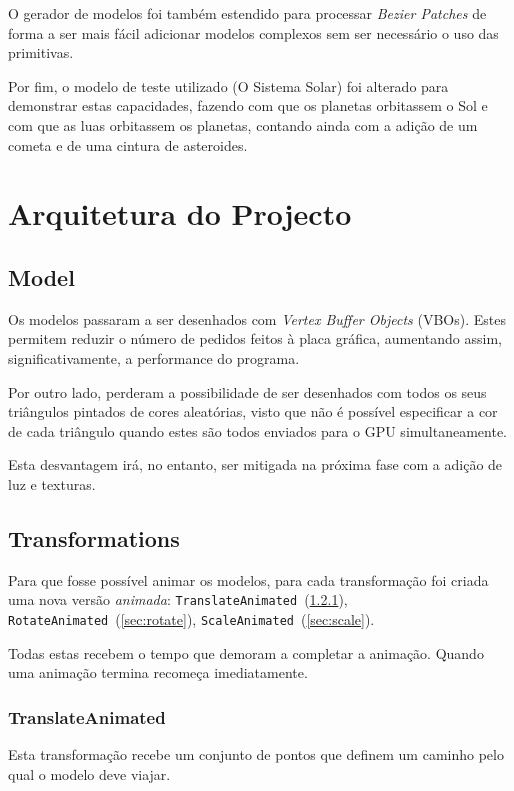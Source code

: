 \documentclass[a4paper]{article}
\begin{document}
O gerador de modelos foi também estendido para processar \textit{Bezier Patches} de forma a ser mais fácil adicionar modelos complexos sem ser necessário o uso das primitivas.

Por fim, o modelo de teste utilizado (O Sistema Solar) foi alterado para demonstrar estas capacidades, fazendo com que os planetas orbitassem o Sol e com que as luas orbitassem os planetas, contando ainda com a adição de um cometa e de uma cintura de asteroides.

\section{Arquitetura do Projecto}

\subsection{Model}\label{sec:models}

Os modelos passaram a ser desenhados com \textit{Vertex Buffer Objects} (VBOs). Estes permitem reduzir o número de pedidos feitos à placa gráfica, aumentando assim, significativamente, a performance do programa.

Por outro lado, perderam a possibilidade de ser desenhados com todos os seus triângulos pintados de cores aleatórias, visto que não é possível especificar a cor de cada triângulo quando estes são todos enviados para o GPU simultaneamente.

Esta desvantagem irá, no entanto, ser mitigada na próxima fase com a adição de luz e texturas.

\subsection{Transformations}

Para que fosse possível animar os modelos, para cada transformação foi criada uma nova versão \textit{animada}: \texttt{TranslateAnimated}~(\ref{sec:translate}), \texttt{RotateAnimated}~(\ref{sec:rotate}), \texttt{ScaleAnimated}~(\ref{sec:scale}).

Todas estas recebem o tempo que demoram a completar a animação. Quando uma animação termina recomeça imediatamente.

\subsubsection{TranslateAnimated}\label{sec:translate}

Esta transformação recebe um conjunto de pontos que definem um caminho pelo qual o modelo deve viajar.
\end{document}
